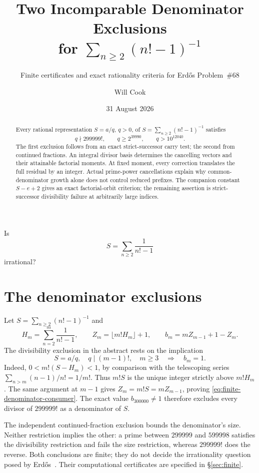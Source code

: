 \documentclass[11pt]{article}
\title{Two Incomparable Denominator Exclusions\\for $\sum_{n\ge2}(n!-1)^{-1}$}
\subtitle{Finite certificates and exact rationality criteria for Erd\H{o}s Problem~\#68}
\author{Will Cook}
\date{31 August 2026}
\newcommand{\Ser}{S}
\begin{document}
\maketitle
\noteprovenance

\begin{problem}[Erd\H{o}s \#68]\label{res:problem}
Is
\[
  \Ser=\sum_{n\ge2}\frac1{n!-1}
\]
irrational?
\end{problem}

\begin{abstract}
Every rational representation $S=a/q$, $q>0$, of
$S=\sum_{n\ge2}(n!-1)^{-1}$ satisfies
\[
q\nmid299999!,\qquad q\ge2^{39990},\qquad q>10^{12040}.
\]
The first exclusion follows from an exact strict-successor carry test;
the second from continued fractions.  An integral divisor basis determines
the cancelling vectors and their attainable factorial moments.  At fixed
moment, every correction translates the full residual by an integer.
Actual prime-power cancellations explain why common-denominator growth
alone does not control reduced prefixes.  The companion constant $S-e+2$
gives an exact factorial-orbit criterion; the remaining assertion is
strict-successor divisibility failure at arbitrarily large indices.
\end{abstract}

\section{The denominator exclusions}\label{sec:problem}

Let $S=\sum_{n\ge2}(n!-1)^{-1}$ and
\[
H_m=\sum_{n=2}^m\frac1{n!-1},\qquad
Z_m=\lfloor m!H_m\rfloor+1,\qquad
b_m=mZ_{m-1}+1-Z_m.
\]
The divisibility exclusion in the abstract rests on the implication
\begin{equation}
S=a/q,\quad q\mid(m-1)!,\quad m\ge3
\quad\Longrightarrow\quad b_m=1.\label{eq:finite-denominator-consumer}
\end{equation}
Indeed, $0<m!(S-H_m)<1$, by comparison with the telescoping
series $\sum_{n>m}(n-1)/n!=1/m!$.  Thus $m!S$ is the unique integer
strictly above $m!H_m$.  The same argument at $m-1$ gives
$Z_m=m!S=mZ_{m-1}$, proving \eqref{eq:finite-denominator-consumer}.
The exact value $b_{300000}\ne1$ therefore excludes every divisor of
$299999!$ as a denominator of $S$.

The independent continued-fraction exclusion bounds the denominator's size.
Neither restriction implies the other: a prime between $299999$ and $599998$
satisfies the divisibility restriction and fails the size restriction,
whereas $299999!$ does the reverse.  Both conclusions are finite; they do
not decide the irrationality question posed by Erd\H{o}s~\cite{erdos1988,bloom}.
Their computational certificates are specified in \S\ref{sec:finite}.
\end{document}
